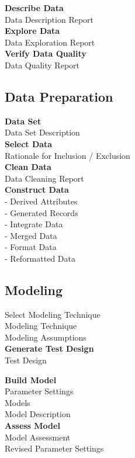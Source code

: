 \documentclass[12pt,a4paper,titlepage]{report}\usepackage{graphicx, color}
\begin{document}
\textbf{Describe Data} \\
Data Description Report \\

\textbf{Explore Data} \\
Data Exploration Report \\

\textbf{Verify Data Quality} \\
Data Quality Report \\

\subsection{Data Preparation} 
\textbf{Data Set} \\
Data Set Description \\

\textbf{Select Data} \\ 
Rationale for Inclusion / Exclusion\\

\textbf{Clean Data} \\ 
Data Cleaning Report \\

\textbf{Construct Data} \\
- Derived Attributes \\ 
- Generated Records \\
- Integrate Data \\
- Merged Data \\
- Format Data \\
- Reformatted Data \\

\subsection{Modeling }
Select Modeling Technique \\
Modeling Technique \\
Modeling Assumptions \\

\textbf{Generate Test Design} \\
Test Design

\textbf{Build Model} \\
Parameter Settings \\
Models \\
Model Description \\

\textbf{Assess Model} \\
Model Assessment \\
Revised Parameter Settings
  
\end{document}
